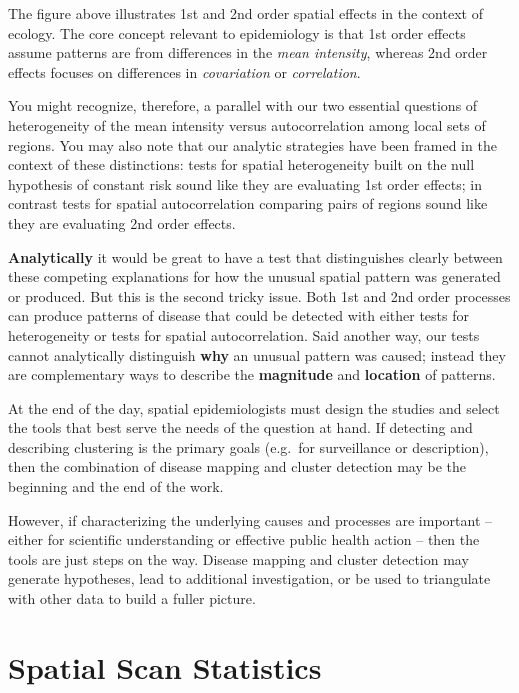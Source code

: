 \documentclass[
]{book}
\begin{document}
The figure above illustrates 1st and 2nd order spatial effects in the context of ecology. The core concept relevant to epidemiology is that 1st order effects assume patterns are from differences in the \emph{mean intensity}, whereas 2nd order effects focuses on differences in \emph{covariation} or \emph{correlation}.

You might recognize, therefore, a parallel with our two essential questions of heterogeneity of the mean intensity versus autocorrelation among local sets of regions. You may also note that our analytic strategies have been framed in the context of these distinctions: tests for spatial heterogeneity built on the null hypothesis of constant risk sound like they are evaluating 1st order effects; in contrast tests for spatial autocorrelation comparing pairs of regions sound like they are evaluating 2nd order effects.

\textbf{Analytically} it would be great to have a test that distinguishes clearly between these competing explanations for how the unusual spatial pattern was generated or produced. But this is the second tricky issue. Both 1st and 2nd order processes can produce patterns of disease that could be detected with either tests for heterogeneity or tests for spatial autocorrelation. Said another way, our tests cannot analytically distinguish \textbf{why} an unusual pattern was caused; instead they are complementary ways to describe the \textbf{magnitude} and \textbf{location} of patterns.

At the end of the day, spatial epidemiologists must design the studies and select the tools that best serve the needs of the question at hand. If detecting and describing clustering is the primary goals (e.g.~for surveillance or description), then the combination of disease mapping and cluster detection may be the beginning and the end of the work.

However, if characterizing the underlying causes and processes are important -- either for scientific understanding or effective public health action -- then the tools are just steps on the way. Disease mapping and cluster detection may generate hypotheses, lead to additional investigation, or be used to triangulate with other data to build a fuller picture.

\hypertarget{spatial-scan-statistics}{%
\section{Spatial Scan Statistics}\label{spatial-scan-statistics}}
\end{document}
